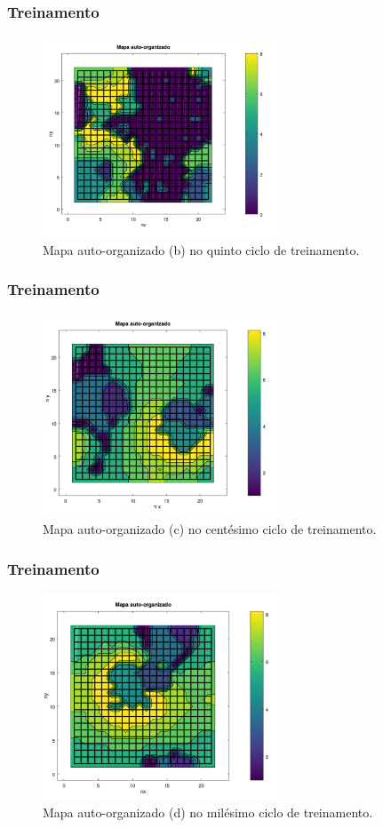 \documentclass[aspectratio=10]{beamer} %
\begin{document}
\begin{frame}
\frametitle{Treinamento}
\begin{figure}
\centering
\includegraphics[width=7.0cm]{Imagens/SOM5_2d.pdf}
\caption{Mapa auto-organizado (b) no quinto ciclo de treinamento.}
\end{figure}
\end{frame}

\begin{frame}
\frametitle{Treinamento}
\begin{figure}
\centering
\includegraphics[width=7.0cm]{Imagens/SOM100_2d.pdf}
\caption{Mapa auto-organizado (c) no centésimo ciclo de treinamento.}
\end{figure}
\end{frame}

\begin{frame}
\frametitle{Treinamento}
\begin{figure}
\centering
\includegraphics[width=7.0cm]{Imagens/SOM1000_2d.pdf}
\caption{Mapa auto-organizado (d) no milésimo ciclo de treinamento.}
\label{SOMd}
\end{figure}
\end{frame}
\end{document}
